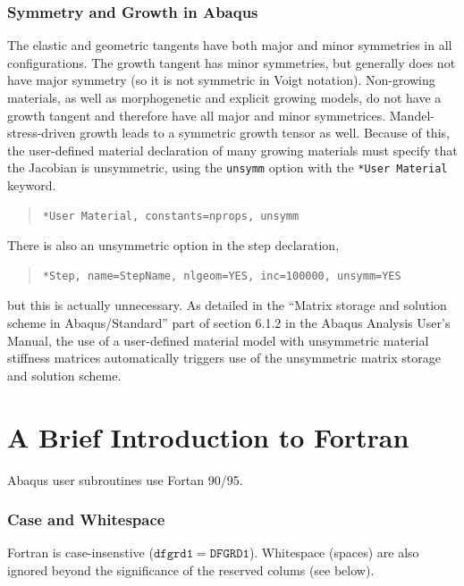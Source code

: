 \documentclass[10pt,letterpaper,oneside]{report}
\begin{document}
\subsection{Symmetry and Growth in Abaqus}
The elastic and geometric tangents have both major and minor symmetries in all configurations.  The growth tangent has minor symmetries, but generally does not have major symmetry (so it is not symmetric in Voigt notation).  Non-growing materials, as well as morphogenetic and explicit growing models, do not have a growth tangent and therefore have all major and minor symmetrices.  Mandel-stress-driven growth leads to a symmetric growth tensor as well.  Because of this, the user-defined material declaration of many growing materials must specify that the Jacobian is unsymmetric, using the \texttt{unsymm} option with the \texttt{*User Material} keyword. 
\begin{quote} 
    \begin{lstlisting}[]
      *User Material, constants=nprops, unsymm
    \end{lstlisting} \end{quote}
    There is also an unsymmetric option in the step declaration, 
    \begin{quote} \begin{lstlisting}[]
      *Step, name=StepName, nlgeom=YES, inc=100000, unsymm=YES
    \end{lstlisting} 
\end{quote}
but this is actually unnecessary.  As detailed in the ``Matrix storage and solution scheme in Abaqus/Standard'' part of section 6.1.2 in the Abaqus Analysis User's Manual, the use of a user-defined material model with unsymmetric material stiffness matrices automatically triggers use of the unsymmetric matrix storage and solution scheme.  

\chapter{A Brief Introduction to Fortran}

Abaqus user subroutines use Fortan 90/95.  

\subsection{Case and Whitespace}
Fortran is case-insenstive ($\mathtt{dfgrd1} = \mathtt{DFGRD1}$).  Whitespace (spaces) are also ignored beyond the significance of the reserved colums (see below).
\end{document}
